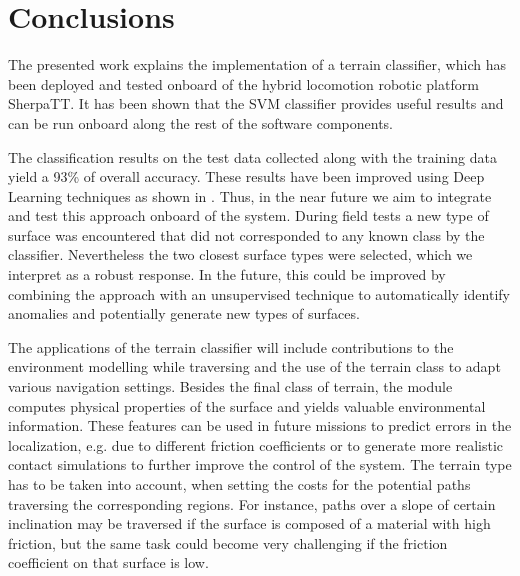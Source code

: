 
\section{Conclusions}

The presented work explains the implementation of a terrain classifier, which has been deployed and tested onboard of the hybrid locomotion robotic platform SherpaTT.
It has been shown that the SVM classifier provides useful results and can be run onboard along the rest of the software components.

The classification results on the test data collected along with the training data yield a 93\% of overall accuracy. 
These results have been improved using Deep Learning techniques as shown in \cite{ugenti2021}. 
Thus, in the near future we aim to integrate and test this approach onboard of the system.
During field tests a new type of surface was encountered that did not corresponded to any known class by the classifier. 
Nevertheless the two closest surface types were selected, which we interpret as a robust response.
In the future, this could be improved by combining the approach with an unsupervised technique to automatically identify anomalies and potentially generate new types of surfaces.

The applications of the terrain classifier will include contributions to the environment modelling while traversing and the use of the terrain class to adapt various navigation settings.
Besides the final class of terrain, the module computes physical properties of the surface and yields valuable environmental information. 
These features can be used in future missions to predict errors in the localization, e.g. due to different friction coefficients or to generate more realistic contact simulations to further improve the control of the system.
The terrain type has to be taken into account, when setting the costs for the potential paths traversing the corresponding regions. 
For instance, paths over a slope of certain inclination may be traversed if the surface is composed of a material with high friction, but the same task could become very challenging if the friction coefficient on that surface is low. 

\clearpage
